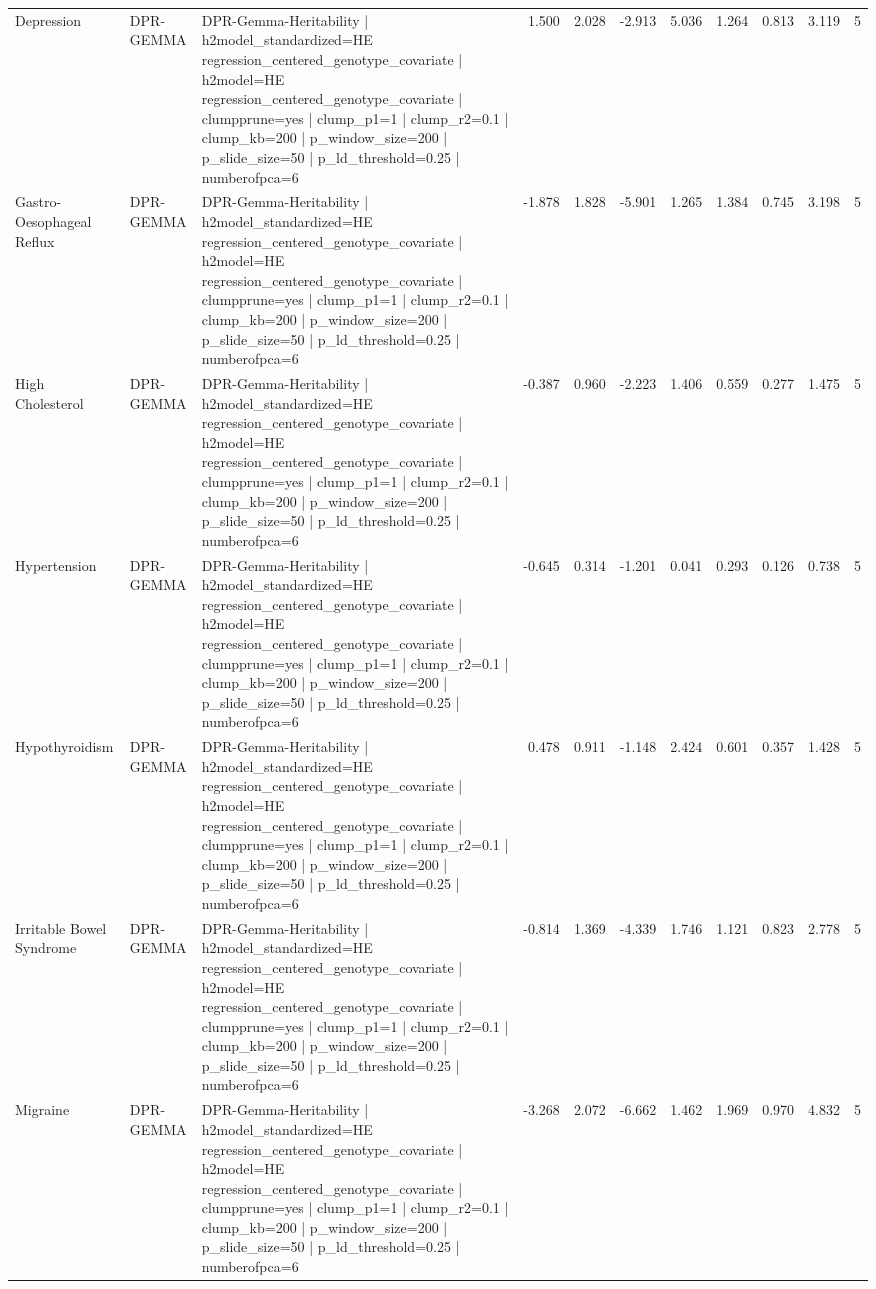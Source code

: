 \begin{landscape}
\begin{longtable}{p{2.4cm}p{1.8cm}p{6.0cm}rrrrrrrr}
Depression & DPR-GEMMA & DPR-Gemma-Heritability | h2model\_standardized=HE regression\_centered\_genotype\_covariate | h2model=HE regression\_centered\_genotype\_covariate | clumpprune=yes | clump\_p1=1 | clump\_r2=0.1 | clump\_kb=200 | p\_window\_size=200 | p\_slide\_size=50 | p\_ld\_threshold=0.25 | numberofpca=6 & 1.500 & 2.028 & -2.913 & 5.036 & 1.264 & 0.813 & 3.119 & 5 \\
Gastro-Oesophageal Reflux & DPR-GEMMA & DPR-Gemma-Heritability | h2model\_standardized=HE regression\_centered\_genotype\_covariate | h2model=HE regression\_centered\_genotype\_covariate | clumpprune=yes | clump\_p1=1 | clump\_r2=0.1 | clump\_kb=200 | p\_window\_size=200 | p\_slide\_size=50 | p\_ld\_threshold=0.25 | numberofpca=6 & -1.878 & 1.828 & -5.901 & 1.265 & 1.384 & 0.745 & 3.198 & 5 \\
High Cholesterol & DPR-GEMMA & DPR-Gemma-Heritability | h2model\_standardized=HE regression\_centered\_genotype\_covariate | h2model=HE regression\_centered\_genotype\_covariate | clumpprune=yes | clump\_p1=1 | clump\_r2=0.1 | clump\_kb=200 | p\_window\_size=200 | p\_slide\_size=50 | p\_ld\_threshold=0.25 | numberofpca=6 & -0.387 & 0.960 & -2.223 & 1.406 & 0.559 & 0.277 & 1.475 & 5 \\
Hypertension & DPR-GEMMA & DPR-Gemma-Heritability | h2model\_standardized=HE regression\_centered\_genotype\_covariate | h2model=HE regression\_centered\_genotype\_covariate | clumpprune=yes | clump\_p1=1 | clump\_r2=0.1 | clump\_kb=200 | p\_window\_size=200 | p\_slide\_size=50 | p\_ld\_threshold=0.25 | numberofpca=6 & -0.645 & 0.314 & -1.201 & 0.041 & 0.293 & 0.126 & 0.738 & 5 \\
Hypothyroidism & DPR-GEMMA & DPR-Gemma-Heritability | h2model\_standardized=HE regression\_centered\_genotype\_covariate | h2model=HE regression\_centered\_genotype\_covariate | clumpprune=yes | clump\_p1=1 | clump\_r2=0.1 | clump\_kb=200 | p\_window\_size=200 | p\_slide\_size=50 | p\_ld\_threshold=0.25 | numberofpca=6 & 0.478 & 0.911 & -1.148 & 2.424 & 0.601 & 0.357 & 1.428 & 5 \\
Irritable Bowel Syndrome & DPR-GEMMA & DPR-Gemma-Heritability | h2model\_standardized=HE regression\_centered\_genotype\_covariate | h2model=HE regression\_centered\_genotype\_covariate | clumpprune=yes | clump\_p1=1 | clump\_r2=0.1 | clump\_kb=200 | p\_window\_size=200 | p\_slide\_size=50 | p\_ld\_threshold=0.25 | numberofpca=6 & -0.814 & 1.369 & -4.339 & 1.746 & 1.121 & 0.823 & 2.778 & 5 \\
Migraine & DPR-GEMMA & DPR-Gemma-Heritability | h2model\_standardized=HE regression\_centered\_genotype\_covariate | h2model=HE regression\_centered\_genotype\_covariate | clumpprune=yes | clump\_p1=1 | clump\_r2=0.1 | clump\_kb=200 | p\_window\_size=200 | p\_slide\_size=50 | p\_ld\_threshold=0.25 | numberofpca=6 & -3.268 & 2.072 & -6.662 & 1.462 & 1.969 & 0.970 & 4.832 & 5 \\

\end{longtable}
\end{landscape}
